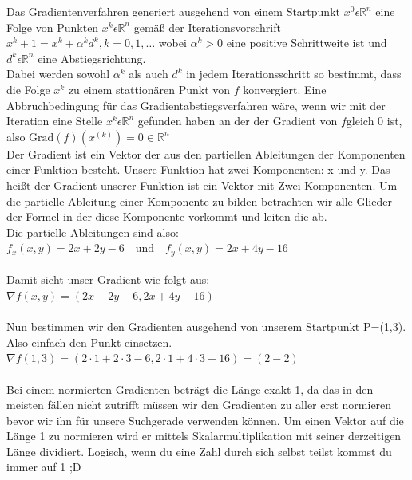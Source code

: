 Das Gradientenverfahren generiert ausgehend von einem Startpunkt $x^0\epsilon\mathbb{R}^n$ eine Folge von Punkten $x^k\epsilon\mathbb{R}^n$ gemäß der Iterationsvorschrift $x^k+1=x^k+\alpha^k d^k, k=0,1,\dots$ 
  wobei $\alpha^k>0$ eine positive Schrittweite ist und $d^k\epsilon\mathbb{R}^n$ eine Abstiegsrichtung.
  \\ 
  Dabei werden sowohl $\alpha^k$ als auch $d^k$  in jedem Iterationsschritt so bestimmt, dass die Folge $x^k$ zu einem stattionären Punkt von $f$ konvergiert.
  Eine Abbruchbedingung für das Gradientabstiegsverfahren wäre, wenn wir mit der Iteration eine Stelle $x^k\epsilon\mathbb{R}^n$ gefunden haben an der der Gradient von $f$gleich 0 ist, also
  $\text{Grad}(f)(x^{(k)}) = 0 \in \mathbb{R}^n$
  \\
\newline Der Gradient ist ein Vektor der aus den partiellen Ableitungen der Komponenten einer Funktion besteht. Unsere Funktion hat zwei Komponenten: x und y.
  Das heißt der Gradient unserer Funktion ist ein Vektor mit Zwei Komponenten.
  Um die partielle Ableitung einer Komponente zu bilden betrachten wir alle Glieder der Formel in der diese Komponente vorkommt und leiten die ab. 
  \\Die partielle Ableitungen sind also:
  \\$f_x(x, y) = 2x + 2y - 6 \quad \text{und} \quad f_y(x, y) = 2x + 4y - 16$
  \\
  \\Damit sieht unser Gradient wie folgt aus:
  \newline $\nabla f(x, y) = (2x + 2y - 6, 2x + 4y - 16)$
  \\
  \\
  Nun bestimmen wir den Gradienten ausgehend von unserem Startpunkt P=(1,3). Also einfach den Punkt einsetzen. 
  \newline $\nabla f(1,3) = (2 \cdot 1 + 2 \cdot 3 - 6, 2 \cdot 1 + 4 \cdot 3 - 16) = (2 - 2)$
\\
\\
Bei einem normierten Gradienten beträgt die Länge exakt 1, da das in den meisten fällen nicht zutrifft müssen wir den Gradienten zu aller erst normieren bevor wir ihn für unsere Suchgerade verwenden können. Um einen Vektor auf die Länge 1 zu normieren wird er mittels Skalarmultiplikation mit seiner derzeitigen Länge dividiert. Logisch, wenn du eine Zahl durch sich selbst teilst kommst du immer auf 1 ;D
